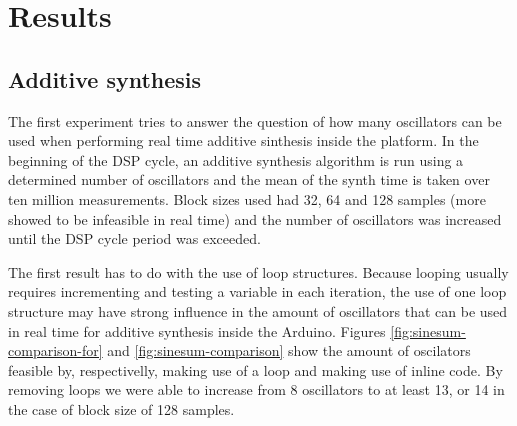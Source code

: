 
\section{Results}
\label{sec:results}


\subsection{Additive synthesis}

The first experiment tries to answer the question of how many oscillators can
be used when performing real time additive sinthesis inside the platform. In
the beginning of the DSP cycle, an additive synthesis algorithm is run using a
determined number of oscillators and the mean of the synth time is taken over
ten million measurements. Block sizes used had 32, 64 and 128 samples (more
showed to be infeasible in real time) and the number of oscillators was
increased until the DSP cycle period was exceeded.

The first result has to do with the use of loop structures. Because looping
usually requires incrementing and testing a variable in each iteration, the
use of one loop structure may have strong influence in the amount of
oscillators that can be used in real time for additive synthesis inside the
Arduino.  Figures \ref{fig:sinesum-comparison-for} and
\ref{fig:sinesum-comparison} show the amount of oscilators feasible by,
respectivelly, making use of a loop and making use of inline code. By removing
loops we were able to increase from 8 oscillators to at least 13, or 14 in the
case of block size of 128 samples.



